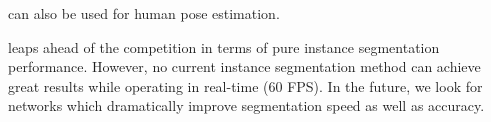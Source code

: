 \maskrcnn can also be used for human pose estimation.


\maskrcnn leaps ahead of the competition in terms of pure instance segmentation performance. However, no current instance segmentation method can achieve great results while operating in real-time (60 FPS). In the future, we look for networks which dramatically improve segmentation speed as well as accuracy.



